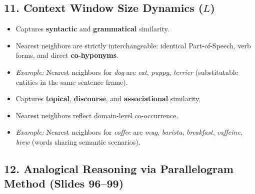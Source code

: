 \documentclass[10pt,a4paper]{article}
\begin{document}
\vspace{-3pt}
\subsection*{\color{themeblue} 11. Context Window Size Dynamics ($L$)}
\vspace{-2pt}

\noindent\begin{minipage}[t]{0.485\textwidth}
\begin{theoremprompt}[title={\textbf{Small Windows ($L = \pm 1$ or $\pm 2$)}}]
\footnotesize
\begin{itemize}[leftmargin=10pt,topsep=1pt,itemsep=1pt]
    \item Captures \textbf{syntactic} and \textbf{grammatical} similarity.
    \item Nearest neighbors are strictly interchangeable: identical Part-of-Speech, verb forms, and direct \textbf{co-hyponyms}.
    \item \textit{Example:} Nearest neighbors for \textit{dog} are \textit{cat}, \textit{puppy}, \textit{terrier} (substitutable entities in the same sentence frame).
\end{itemize}
\end{theoremprompt}
\end{minipage}\hfill
\begin{minipage}[t]{0.485\textwidth}
\begin{theoremprompt}[title={\textbf{Large Windows ($L = \pm 5$ to $\pm 10$)}}]
\footnotesize
\begin{itemize}[leftmargin=10pt,topsep=1pt,itemsep=1pt]
    \item Captures \textbf{topical}, \textbf{discourse}, and \textbf{associational} similarity.
    \item Nearest neighbors reflect domain-level co-occurrence.
    \item \textit{Example:} Nearest neighbors for \textit{coffee} are \textit{mug}, \textit{barista}, \textit{breakfast}, \textit{caffeine}, \textit{brew} (words sharing semantic scenarios).
\end{itemize}
\end{theoremprompt}
\end{minipage}

\vspace{1pt}
\subsection*{\color{themeblue} 12. Analogical Reasoning via Parallelogram Method (Slides 96--99)}
\vspace{-2pt}
\end{document}
